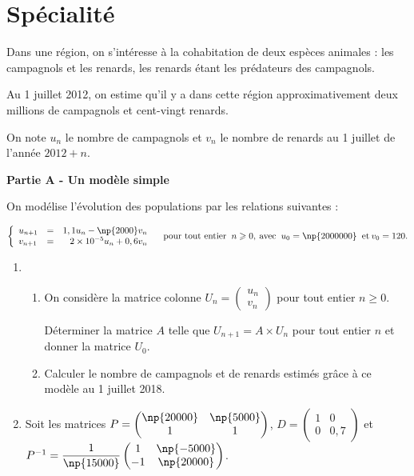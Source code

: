 \documentclass{cornouaille}
\begin{document}
\section{Spécialité}
\begin{exercice}[Spécialité][5]


Dans une région, on s'intéresse à la cohabitation de deux espèces animales : les campagnols et les
renards, les renards étant les prédateurs des campagnols. 

Au 1 juillet 2012, on estime qu'il y a dans cette région approximativement deux millions de campagnols et cent-vingt renards.

On note $u_n$ le nombre de campagnols et $v_n$ le nombre de renards au 1 juillet de l'année $2012+ n$.

\bigskip

\textbf{Partie A - Un modèle simple}

\medskip

On modélise l'évolution des populations par les relations suivantes :

\[\left\{\begin{array}{l c r}
u_{n+1}& =& 1,1u_n - \np{2000}v_n\\
v_{n+1} &=& 2 \times 10^{-5}u_n + 0,6v_n
\end{array}\right. \quad \text{pour tout entier }\:n \geqslant 0,\: \text{avec } \:u_0 = \np{2000000}\:  \text{ et} \: v_0 = 120.\]

\medskip

\begin{enumerate}
\item 
	\begin{enumerate}
		\item On considère la matrice colonne $U_n = \begin{pmatrix}u_n\\v_n\end{pmatrix}$ pour tout entier $n \geqslant 0$.
		
Déterminer la matrice $A$ telle que $U_{n+1} = A \times U_n$ pour tout entier $n$ et donner la matrice $U_0$.
		\item Calculer le nombre de campagnols et de renards estimés grâce à ce modèle au 1 juillet
2018.
	\end{enumerate}
\item Soit les matrices $P = \begin{pmatrix}\np{20000}&\np{5000}\\1&1\end{pmatrix}$, \:$D = \begin{pmatrix}1&0\\0&0,7\end{pmatrix}$ et $P^{-1} = \dfrac{1}{\np{15000}}\begin{pmatrix}1& \np{-5000}\\- 1&\np{20000}\end{pmatrix}$.
	

\end{enumerate}
\end{exercice}
\end{document}
